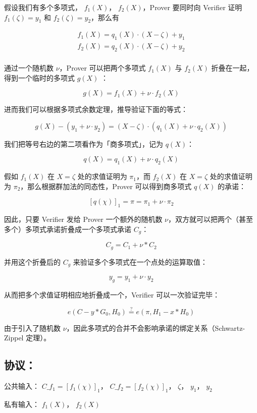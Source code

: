假设我们有多个多项式， \(f_1(X)\)， \(f_2(X)\)，Prover 要同时向 Verifier
证明 \(f_1(\zeta)=y_1\) 和 \(f_2(\zeta)=y_2\)，那么有

\[
\begin{array}{l}
f_1(X) = q_1(X)\cdot (X-\zeta) + y_1\\ 
f_2(X) = q_2(X) \cdot (X-\zeta) + y_2 \\
\end{array}
\]

通过一个随机数 \(\nu\)，Prover 可以把两个多项式 \(f_1(X)\) 与 \(f_2(X)\)
折叠在一起，得到一个临时的多项式 \(g(X)\) ：

\[
g(X) = f_1(X) + \nu\cdot f_2(X)
\]

进而我们可以根据多项式余数定理，推导验证下面的等式：

\[
g(X) - (y_1 + \nu\cdot y_2) = (X-\zeta)\cdot (q_1(X) + \nu\cdot q_2(X))
\]

我们把等号右边的第二项看作为「商多项式」，记为 \(q(X)\)：

\[
q(X) = q_1(X) + \nu\cdot q_2(X)
\]

假如 \(f_1(X)\) 在 \(X=\zeta\) 处的求值证明为 \(\pi_1\)，而 \(f_2(X)\)
在 \(X=\zeta\) 处的求值证明为 \(\pi_2\)，那么根据群加法的同态性，Prover
可以得到商多项式 \(q(X)\) 的承诺：

\[
[q(\chi)]_1 = \pi = \pi_1 + \nu\cdot\pi_2
\]

因此，只要 Verifier 发给 Prover 一个额外的随机数
\(\nu\)，双方就可以把两个（甚至多个）多项式承诺折叠成一个多项式承诺
\(C_g\)：

\[
C_g = C_1 + \nu\ast C_2
\]

并用这个折叠后的 \(C_g\) 来验证多个多项式在一个点处的运算取值：

\[
y_g = y_1 + \nu\cdot y_2
\]

从而把多个求值证明相应地折叠成一个，Verifier 可以一次验证完毕：

\[
e(C-y\ast G_0, H_0) \overset{?}{=}e(\pi, H_1 - x\ast H_0)
\]

由于引入了随机数
\(\nu\)，因此多项式的合并不会影响承诺的绑定关系（Schwartz-Zippel
定理）。

\hypertarget{ux534fux8bae}{%
\subsection{协议：}\label{ux534fux8bae}}

公共输入： \(C\_{f_1}=[f_1(\chi)]_1\)， \(C\_{f_2}=[f_2(\chi)]_1\)，
\(\zeta\)， \(y_1\)， \(y_2\)

私有输入： \(f_1(X)\)， \(f_2(X)\)

